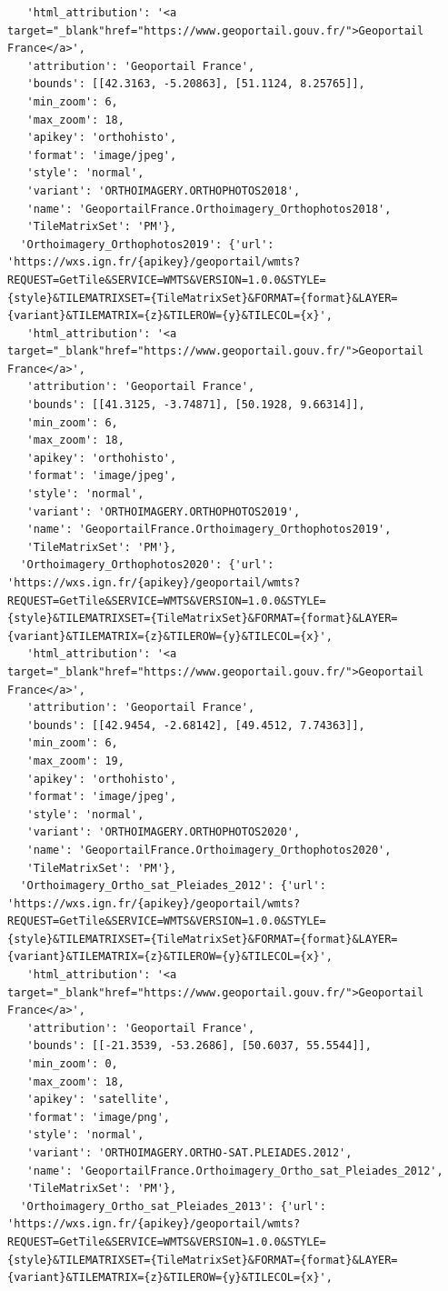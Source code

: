 \documentclass[
  letterpaper,
  DIV=11,
  numbers=noendperiod]{scrreprt}
\begin{document}
\begin{verbatim}
   'html_attribution': '<a target="_blank"href="https://www.geoportail.gouv.fr/">Geoportail France</a>',
   'attribution': 'Geoportail France',
   'bounds': [[42.3163, -5.20863], [51.1124, 8.25765]],
   'min_zoom': 6,
   'max_zoom': 18,
   'apikey': 'orthohisto',
   'format': 'image/jpeg',
   'style': 'normal',
   'variant': 'ORTHOIMAGERY.ORTHOPHOTOS2018',
   'name': 'GeoportailFrance.Orthoimagery_Orthophotos2018',
   'TileMatrixSet': 'PM'},
  'Orthoimagery_Orthophotos2019': {'url': 'https://wxs.ign.fr/{apikey}/geoportail/wmts?REQUEST=GetTile&SERVICE=WMTS&VERSION=1.0.0&STYLE={style}&TILEMATRIXSET={TileMatrixSet}&FORMAT={format}&LAYER={variant}&TILEMATRIX={z}&TILEROW={y}&TILECOL={x}',
   'html_attribution': '<a target="_blank"href="https://www.geoportail.gouv.fr/">Geoportail France</a>',
   'attribution': 'Geoportail France',
   'bounds': [[41.3125, -3.74871], [50.1928, 9.66314]],
   'min_zoom': 6,
   'max_zoom': 18,
   'apikey': 'orthohisto',
   'format': 'image/jpeg',
   'style': 'normal',
   'variant': 'ORTHOIMAGERY.ORTHOPHOTOS2019',
   'name': 'GeoportailFrance.Orthoimagery_Orthophotos2019',
   'TileMatrixSet': 'PM'},
  'Orthoimagery_Orthophotos2020': {'url': 'https://wxs.ign.fr/{apikey}/geoportail/wmts?REQUEST=GetTile&SERVICE=WMTS&VERSION=1.0.0&STYLE={style}&TILEMATRIXSET={TileMatrixSet}&FORMAT={format}&LAYER={variant}&TILEMATRIX={z}&TILEROW={y}&TILECOL={x}',
   'html_attribution': '<a target="_blank"href="https://www.geoportail.gouv.fr/">Geoportail France</a>',
   'attribution': 'Geoportail France',
   'bounds': [[42.9454, -2.68142], [49.4512, 7.74363]],
   'min_zoom': 6,
   'max_zoom': 19,
   'apikey': 'orthohisto',
   'format': 'image/jpeg',
   'style': 'normal',
   'variant': 'ORTHOIMAGERY.ORTHOPHOTOS2020',
   'name': 'GeoportailFrance.Orthoimagery_Orthophotos2020',
   'TileMatrixSet': 'PM'},
  'Orthoimagery_Ortho_sat_Pleiades_2012': {'url': 'https://wxs.ign.fr/{apikey}/geoportail/wmts?REQUEST=GetTile&SERVICE=WMTS&VERSION=1.0.0&STYLE={style}&TILEMATRIXSET={TileMatrixSet}&FORMAT={format}&LAYER={variant}&TILEMATRIX={z}&TILEROW={y}&TILECOL={x}',
   'html_attribution': '<a target="_blank"href="https://www.geoportail.gouv.fr/">Geoportail France</a>',
   'attribution': 'Geoportail France',
   'bounds': [[-21.3539, -53.2686], [50.6037, 55.5544]],
   'min_zoom': 0,
   'max_zoom': 18,
   'apikey': 'satellite',
   'format': 'image/png',
   'style': 'normal',
   'variant': 'ORTHOIMAGERY.ORTHO-SAT.PLEIADES.2012',
   'name': 'GeoportailFrance.Orthoimagery_Ortho_sat_Pleiades_2012',
   'TileMatrixSet': 'PM'},
  'Orthoimagery_Ortho_sat_Pleiades_2013': {'url': 'https://wxs.ign.fr/{apikey}/geoportail/wmts?REQUEST=GetTile&SERVICE=WMTS&VERSION=1.0.0&STYLE={style}&TILEMATRIXSET={TileMatrixSet}&FORMAT={format}&LAYER={variant}&TILEMATRIX={z}&TILEROW={y}&TILECOL={x}',

\end{verbatim}
\end{document}
